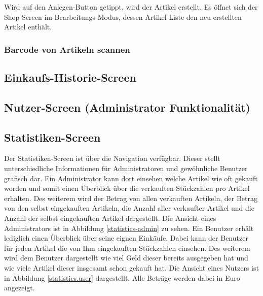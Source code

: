 Wird auf den Anlegen-Button getippt, wird der Artikel erstellt.
Es öffnet sich der Shop-Screen im Bearbeitungs-Modus, dessen Artikel-Liste den neu erstellten Artikel enthält.


\subsubsection{Barcode von Artikeln scannen} \label{subsubsec:shop-admin-scan-item}


\subsection{Einkaufs-Historie-Screen} \label{subsec:purchases-screen}


\subsection{Nutzer-Screen (Administrator Funktionalität)} \label{subsec:user-screen}

\subsection{Statistiken-Screen} \label{subsec:statistics-screen}
Der Statistiken-Screen ist über die Navigation verfügbar. Dieser stellt unterschiedliche Informationen für Administratoren und gewöhnliche Benutzer grafisch dar. Ein Administrator kann dort einsehen welche Artikel wie oft gekauft worden und somit einen Überblick über die verkauften Stückzahlen pro Artikel erhalten. Des weiterem wird der Betrag von allen verkauften Artikeln, der Betrag von den selbst eingekauften Artikeln, die Anzahl aller verkaufter Artikel und die Anzahl der selbst eingekauften Artikel dargestellt. Die Ansicht eines Administrators ist in Abbildung \ref{statistics-admin} zu sehen. Ein Benutzer erhält lediglich einen Überblick über seine eignen Einkäufe. Dabei kann der Benutzer für jeden Artikel die von Ihm eingekauften Stückzahlen einsehen. Des weiterem wird dem Benutzer dargestellt wie viel Geld dieser bereits ausgegeben hat und wie viele Artikel dieser insgesamt schon gekauft hat. Die Ansicht eines Nutzers ist in Abbildung \ref{statistics.user} dargestellt. Alle Beträge werden dabei in Euro angezeigt.


